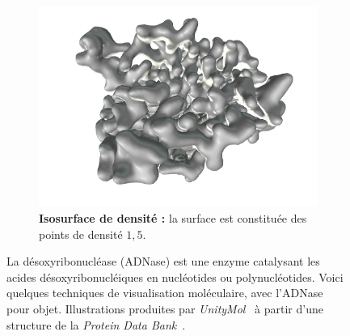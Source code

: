 \begin{figure}[!htbp]
\begin{subfigure}[t]{\subImgW}
		\end{subfigure}
		~
		\begin{subfigure}[t]{\subImgW}
			\centering
			\includegraphics[width=\textwidth]{./figures/ch1/4awn_iso_1_5}
			\caption[Isosurface de densité]{\textbf{Isosurface de densité :} la surface est constituée des points de densité $1,5$.}
			\label{fig:4awn_iso_1_5}
		\end{subfigure}
		\caption[Modes de représentation moléculaire]{La désoxyribonucléase (ADNase) est une enzyme catalysant les acides désoxyribonucléiques en nucléotides ou polynucléotides. Voici quelques techniques de visualisation moléculaire, avec l'ADNase pour objet. Illustrations produites par \emph{UnityMol}~\cite{doutreligne2014unitymol} à partir d'une structure de la \emph{Protein Data Bank}~\cite{parsiegla2012structure}.}
		\label{fig:4awn_atom}
	\end{figure}